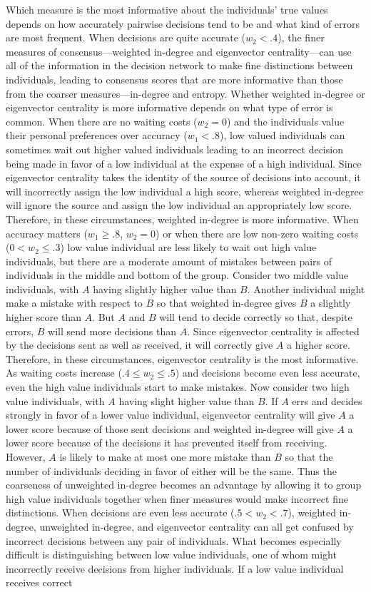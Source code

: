 \documentclass{article}
\begin{document}
Which measure is the most informative about the individuals' true values depends on how accurately pairwise decisions tend to be and what kind of errors are most frequent. When decisions are quite accurate ($w_2<.4$), the finer measures of consensus---weighted in-degree and eigenvector centrality---can use all of the information in the decision network to make fine distinctions between individuals, leading to consensus scores that are more informative than those from the coarser measures---in-degree and entropy.  Whether weighted in-degree or eigenvector centrality is more informative depends on what type of error is common. When there are no waiting costs ($w_2=0$) and the individuals value their personal preferences over accuracy ($w_1<.8$), low valued individuals can sometimes wait out higher valued individuals leading to an incorrect  decision being made in favor of a low individual at the expense of a high individual. Since eigenvector centrality takes the identity of the source of decisions into account, it will incorrectly assign the low individual a high score, whereas weighted in-degree will ignore the source and assign the low individual an appropriately low score.  Therefore, in these circumstances, weighted in-degree is more informative. When accuracy matters ($w_1\geq .8$, $w_2=0$) or when there are low non-zero waiting costs ($0<w_2\leq .3$) low value individual are less likely to wait out high value individuals, but there are a moderate amount of mistakes between pairs of individuals in the middle and bottom of the group. Consider two middle value individuals, with $A$ having slightly higher value than $B$. Another individual might make a mistake with respect to $B$ so that weighted in-degree gives $B$ a slightly higher score than $A$. But $A$ and $B$ will tend to decide correctly so that, despite errors, $B$ will send more decisions than $A$. Since eigenvector centrality is affected by the decisions sent as well as received, it will correctly give $A$ a higher score. Therefore, in these circumstances, eigenvector centrality is the most informative. As waiting costs increase ($.4 \leq w_2 \leq .5$) and decisions become even less accurate, even the high value individuals start to make mistakes. Now consider two high value individuals, with $A$ having slight higher value than $B$. If $A$ errs and decides strongly in favor of a lower value individual, eigenvector centrality will give $A$ a lower score because of those sent decisions and weighted in-degree will give $A$ a lower score because of the decisions it has prevented itself from receiving. However, $A$ is likely to make at most one more mistake than $B$ so that the number of individuals deciding in favor of either will be the same. Thus the coarseness of unweighted in-degree becomes an advantage by allowing it to group high value individuals together when finer measures would make incorrect fine distinctions. When decisions are even less accurate ($.5<w_2<.7$), weighted in-degree, unweighted in-degree, and eigenvector centrality can all get confused by incorrect decisions between any pair of individuals. What becomes especially difficult is distinguishing between low value individuals, one of whom might incorrectly receive decisions from higher individuals. If a low value individual receives correct 
\end{document}
